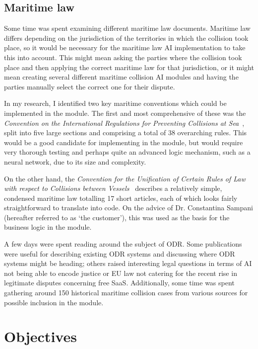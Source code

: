 \subsection{Maritime law}\label{subsection:maritimeLaw}

Some time was spent examining different maritime law documents. Maritime law differs depending on the jurisdiction of the territories in which the collision took place, so it would be necessary for the maritime law AI implementation to take this into account. This might mean asking the parties where the collision took place and then applying the correct maritime law for that jurisdiction, or it might mean creating several different maritime collision AI modules and having the parties manually select the correct one for their dispute.

In my research, I identified two key maritime conventions which could be implemented in the module. The first and most comprehensive of these was the \emph{Convention on the International Regulations for Preventing Collisions at Sea}~\cite{law:long}, split into five large sections and comprising a total of 38 overarching rules. This would be a good candidate for implementing in the module, but would require very thorough testing and perhaps quite an advanced logic mechanism, such as a neural network, due to its size and complexity.

On the other hand, the \emph{Convention for the Unification of Certain Rules of Law with respect to Collisions between Vessels}~\cite{law:short} describes a relatively simple, condensed maritime law totalling 17 short articles, each of which looks fairly straightforward to translate into code. On the advice of Dr. Constantina Sampani (hereafter referred to as `the customer'), this was used as the basis for the business logic in the module.

A few days were spent reading around the subject of ODR. Some publications were useful for describing existing ODR systems \cite{br:cyberMediation} and discussing where ODR systems might be heading; \cite{br:generations}  others raised interesting legal questions in terms of AI not being able to encode justice \cite{br:gameTheory} or EU law not catering for the recent rise in legitimate disputes concerning free SaaS. \cite{br:cloudComputing} Additionally, some time was spent gathering around 150 historical maritime collision cases from various sources for possible inclusion in the module. \cite{cases1}\cite{cases2}\cite{cases3}

\section{Objectives}

